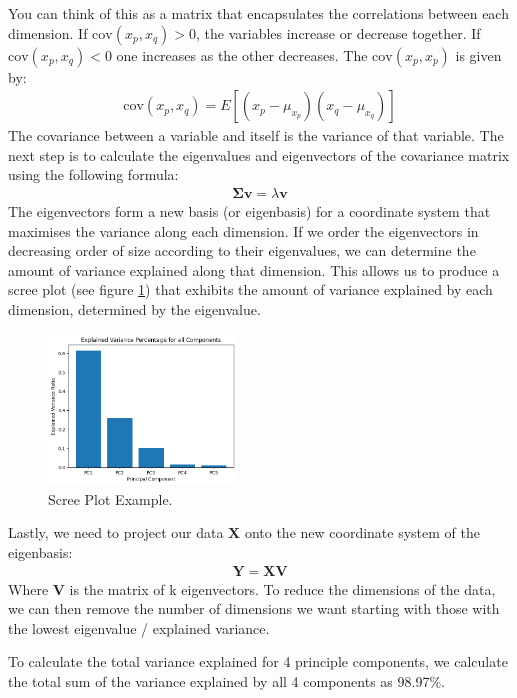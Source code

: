 \documentclass{article}
\newcommand{\matrx}[1]{\bm{#1}}
\begin{document}
	You can think of this as a matrix that encapsulates the correlations between each dimension. If $ \mathrm{cov}(x_p, x_q) > 0 $, the variables increase or decrease together. If $ \mathrm{cov}(x_p, x_q) < 0 $ one increases as the other decreases.  The $ \mathrm{cov}(x_p, x_p) $ is given by:
	\begin{align}
		\mathrm{cov}(x_p, x_q) = E[(x_p - \mu_{x_p})(x_q - \mu_{x_q})]
	\end{align}
	The covariance between a variable and itself is the variance of that variable. The next step is to calculate the eigenvalues and eigenvectors of the covariance matrix using the following formula:
	\begin{align}
		\mathbf{\Sigma}\mathbf{v} = \lambda\mathbf{v}
	\end{align}
	The eigenvectors form a new basis (or eigenbasis) for a coordinate system that maximises the variance along each dimension. If we order the eigenvectors in decreasing order of size according to their eigenvalues, we can determine the amount of variance explained along that dimension. This allows us to produce a scree plot (see figure \ref{fig:screen_plot}) that exhibits the amount of variance explained by each dimension, determined by the eigenvalue.
	\begin{figure}
		\centering
		\includegraphics*[width = 5cm]{scree_plot_example.png}
		\caption{Scree Plot Example.}
		\label{fig:screen_plot}
	\end{figure}
	Lastly, we need to project our data $ \matrx{X} $ onto the new coordinate system of the eigenbasis:
	\begin{align}
		\matrx{Y} = \matrx{X}\matrx{V}
	\end{align}
	Where $ \matrx{V} $ is the matrix of k eigenvectors. To reduce the dimensions of the data, we can then remove the number of dimensions we want starting with those with the lowest eigenvalue / explained variance.
	
	To calculate the total variance explained for 4 principle components, we calculate the total sum of the variance explained by all 4 components as 98.97\%.
	
\end{document}
